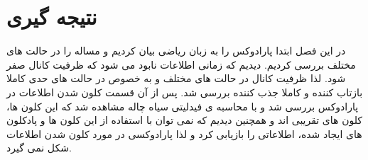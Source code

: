 \section{نتیجه گیری}
در این فصل ابتدا پارادوکس را به زبان ریاضی بیان کردیم و مساله را در حالت های مختلف بررسی کردیم. دیدیم که زمانی اطلاعات نابود می شود که ظرفیت کانال صفر شود. لذا ظرفیت کانال در حالت های مختلف و به خصوص در حالت های حدی کاملا بازتاب کننده و کاملا جذب کننده بررسی شد. پس از آن قسمت کلون شدن اطلاعات در پارادوکس بررسی شد و با محاسبه ی فیدلیتی سیاه چاله مشاهده شد که این کلون ها، کلون های تقریبی اند و همچنین دیدیم که نمی توان با استفاده از این کلون ها و پادکلون های ایجاد شده، اطلاعاتی را بازیابی کرد و لذا پارادوکسی در مورد کلون شدن اطلاعات شکل نمی گیرد.
